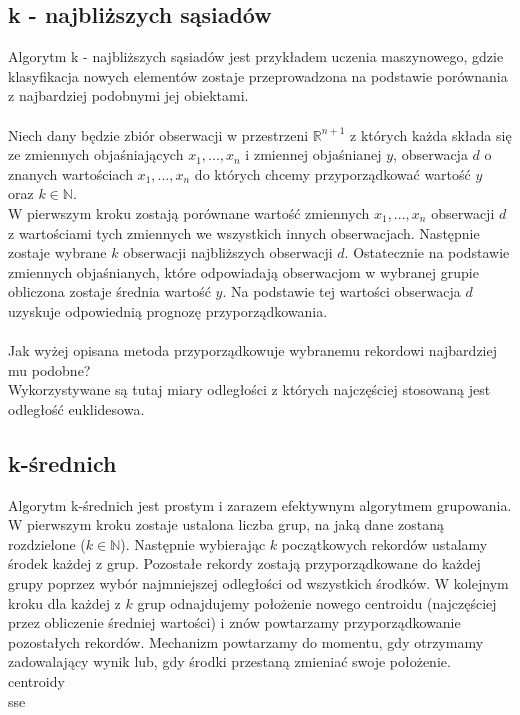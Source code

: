 \documentclass[12pt,a4paper]{report}
\begin{document}
\subsection{k - najbliższych sąsiadów}%
Algorytm k - najbliższych sąsiadów jest przykładem uczenia maszynowego, gdzie klasyfikacja nowych elementów zostaje przeprowadzona na podstawie porównania z najbardziej podobnymi jej obiektami.
\\
\\Niech dany będzie zbiór obserwacji w przestrzeni $\mathbb{R}^{n+1}$ z których każda składa się ze zmiennych objaśniających $x_1, ...,x_n$ i zmiennej objaśnianej $y$, obserwacja $d$ o znanych wartościach $x_1, ...,x_n$ do których chcemy przyporządkować wartość $y$ oraz $k\in \mathbb{N}$.
\\W pierwszym kroku zostają porównane wartość zmiennych $x_1, ...,x_n$ obserwacji $d$ z wartościami tych zmiennych we wszystkich innych obserwacjach. Następnie zostaje wybrane $k$ obserwacji najbliższych obserwacji $d$. Ostatecznie na podstawie zmiennych objaśnianych, które odpowiadają obserwacjom w wybranej grupie obliczona zostaje średnia wartość $y$. Na podstawie tej wartości obserwacja $d$ uzyskuje odpowiednią prognozę przyporządkowania.
\\
\\Jak wyżej opisana metoda przyporządkowuje wybranemu rekordowi najbardziej mu podobne?
\\Wykorzystywane są tutaj miary odległości z których najczęściej stosowaną jest odległość euklidesowa.
\subsection{k-średnich}%
Algorytm k-średnich jest prostym i zarazem efektywnym algorytmem grupowania.
\\W pierwszym kroku zostaje ustalona liczba grup, na jaką dane zostaną rozdzielone ($k \in \mathbb{N}$). Następnie wybierając $k$ początkowych rekordów ustalamy środek każdej z grup. Pozostałe rekordy zostają przyporządkowane do każdej grupy poprzez wybór najmniejszej odległości od wszystkich środków. W kolejnym kroku dla każdej z $k$ grup odnajdujemy położenie nowego centroidu (najczęściej przez obliczenie średniej wartości) i znów powtarzamy przyporządkowanie pozostałych rekordów. Mechanizm powtarzamy do momentu, gdy otrzymamy zadowalający wynik lub, gdy środki przestaną zmieniać swoje położenie.
 \\centroidy
 \\sse
\end{document}
